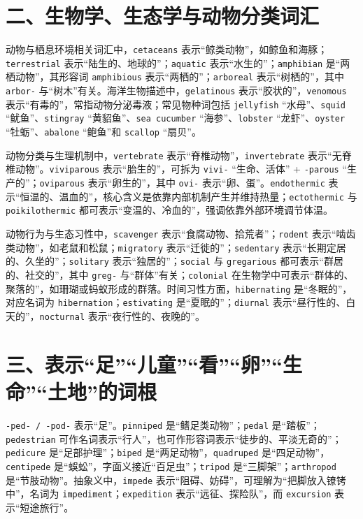 \documentclass[UTF8,zihao=-4]{ctexart}
\begin{document}
\section*{二、生物学、生态学与动物分类词汇}

动物与栖息环境相关词汇中，\texttt{cetaceans} 表示“鲸类动物”，如鲸鱼和海豚；\texttt{terrestrial} 表示“陆生的、地球的”；\texttt{aquatic} 表示“水生的”；\texttt{amphibian} 是“两栖动物”，其形容词 \texttt{amphibious} 表示“两栖的”；\texttt{arboreal} 表示“树栖的”，其中 \texttt{arbor-} 与“树木”有关。海洋生物描述中，\texttt{gelatinous} 表示“胶状的”，\texttt{venomous} 表示“有毒的”，常指动物分泌毒液；常见物种词包括 \texttt{jellyfish} “水母”、\texttt{squid} “鱿鱼”、\texttt{stingray} “黄貂鱼”、\texttt{sea cucumber} “海参”、\texttt{lobster} “龙虾”、\texttt{oyster} “牡蛎”、\texttt{abalone} “鲍鱼”和 \texttt{scallop} “扇贝”。

动物分类与生理机制中，\texttt{vertebrate} 表示“脊椎动物”，\texttt{invertebrate} 表示“无脊椎动物”。\texttt{viviparous} 表示“胎生的”，可拆为 \texttt{vivi-} “生命、活体” + \texttt{-parous} “生产的”；\texttt{oviparous} 表示“卵生的”，其中 \texttt{ovi-} 表示“卵、蛋”。\texttt{endothermic} 表示“恒温的、温血的”，核心含义是依靠内部机制产生并维持热量；\texttt{ectothermic} 与 \texttt{poikilothermic} 都可表示“变温的、冷血的”，强调依靠外部环境调节体温。

动物行为与生态习性中，\texttt{scavenger} 表示“食腐动物、拾荒者”；\texttt{rodent} 表示“啮齿类动物”，如老鼠和松鼠；\texttt{migratory} 表示“迁徙的”；\texttt{sedentary} 表示“长期定居的、久坐的”；\texttt{solitary} 表示“独居的”；\texttt{social} 与 \texttt{gregarious} 都可表示“群居的、社交的”，其中 \texttt{greg-} 与“群体”有关；\texttt{colonial} 在生物学中可表示“群体的、聚落的”，如珊瑚或蚂蚁形成的群落。时间习性方面，\texttt{hibernating} 是“冬眠的”，对应名词为 \texttt{hibernation}；\texttt{estivating} 是“夏眠的”；\texttt{diurnal} 表示“昼行性的、白天的”，\texttt{nocturnal} 表示“夜行性的、夜晚的”。

\section*{三、表示“足”“儿童”“看”“卵”“生命”“土地”的词根}

\texttt{-ped- / -pod-} 表示“足”。\texttt{pinniped} 是“鳍足类动物”；\texttt{pedal} 是“踏板”；\texttt{pedestrian} 可作名词表示“行人”，也可作形容词表示“徒步的、平淡无奇的”；\texttt{pedicure} 是“足部护理”；\texttt{biped} 是“两足动物”，\texttt{quadruped} 是“四足动物”，\texttt{centipede} 是“蜈蚣”，字面义接近“百足虫”；\texttt{tripod} 是“三脚架”；\texttt{arthropod} 是“节肢动物”。抽象义中，\texttt{impede} 表示“阻碍、妨碍”，可理解为“把脚放入镣铐中”，名词为 \texttt{impediment}；\texttt{expedition} 表示“远征、探险队”，而 \texttt{excursion} 表示“短途旅行”。
\end{document}
